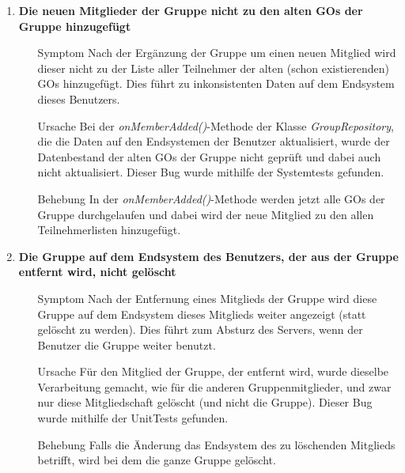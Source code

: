 \documentclass[11pt,a4paper]{scrartcl}
\def\threedigits#1{%
  \ifnum#1<100 0\fi
  \ifnum#1<10 0\fi
  \number#1}
\begin{document}
\begin{enumerate}[label={\textbf{/B\protect\threedigits{\theenumi}0/}}, leftmargin=*]
\item \textbf{Die neuen Mitglieder der Gruppe nicht zu den alten GOs der Gruppe hinzugefügt}
	\begin{itemize}
		\item[Symptom] Nach der Ergänzung der Gruppe um einen neuen Mitglied wird dieser nicht zu der Liste aller Teilnehmer der alten (schon existierenden) GOs hinzugefügt. Dies führt zu inkonsistenten Daten auf dem Endsystem dieses Benutzers.
		\item[Ursache] Bei der \textit{onMemberAdded()}-Methode der Klasse \textit{GroupRepository}, die die Daten auf den Endsystemen der Benutzer aktualisiert, wurde der Datenbestand der alten GOs der Gruppe nicht geprüft und dabei auch nicht aktualisiert. Dieser Bug wurde mithilfe der Systemtests gefunden.
		\item[Behebung] In der \textit{onMemberAdded()}-Methode werden jetzt alle GOs der Gruppe durchgelaufen und dabei wird der neue Mitglied zu den allen Teilnehmerlisten hinzugefügt.
	\end{itemize}
	
\item \textbf{Die Gruppe auf dem Endsystem des Benutzers, der aus der Gruppe entfernt wird, nicht gelöscht}
	\begin{itemize}
		\item[Symptom] Nach der Entfernung eines Mitglieds der Gruppe wird diese Gruppe auf dem Endsystem dieses Mitglieds weiter angezeigt (statt gelöscht zu werden). Dies führt zum Absturz des Servers, wenn der Benutzer die Gruppe weiter benutzt.
		\item[Ursache] Für den Mitglied der Gruppe, der entfernt wird, wurde dieselbe Verarbeitung gemacht, wie für die anderen Gruppenmitglieder, und zwar nur diese Mitgliedschaft gelöscht (und nicht die Gruppe). Dieser Bug wurde mithilfe der UnitTests gefunden.
		\item[Behebung] Falls die Änderung das Endsystem des zu löschenden Mitglieds betrifft, wird bei dem die ganze Gruppe gelöscht.
	\end{itemize}
	

\end{enumerate}
\end{document}
